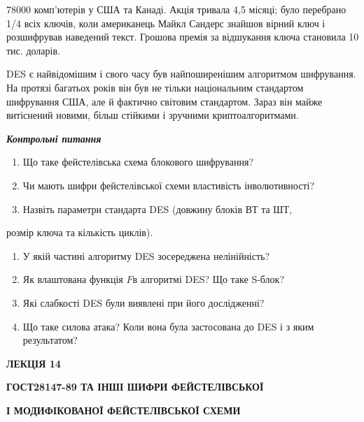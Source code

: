 78000 комп’ютерів у США та Канаді. Акція тривала 4,5 місяці; було перебрано 1/4
всіх ключів, коли американець Майкл Сандерс знайшов вірний ключ і розшифрував
наведений текст. Грошова премія за відшукання ключа становила 10 тис. доларів.

DES є найвідомішим і свого часу був найпоширенішим алгоритмом шифрування. На
протязі багатьох років він був не тільки національним стандартом шифрування
США, але й фактично світовим стандартом. Зараз він майже витіснений новими,
більш стійкими і зручними криптоалгоритмами.


\bigskip

{\centering\bfseries\itshape
Контрольні питання
\par}


\bigskip


\bigskip

\liststyleWWviiiNumxviii
\begin{enumerate}
\item Що таке фейстелівська схема блокового шифрування? 
\item Чи мають шифри фейстелівської схеми властивість інволютивності?
\item Назвіть параметри стандарта DES (довжину блоків ВТ та ШТ, 
\end{enumerate}
розмір ключа та кількість циклів).

\liststyleWWviiiNumxviii
\setcounter{saveenum}{\value{enumi}}
\begin{enumerate}
\setcounter{enumi}{\value{saveenum}}
\item У якій частині алгоритму DES зосереджена нелінійність?
\item Як влаштована функція $F$в алгоритмі DES? Що таке
S{}-блок?
\item Які слабкості DES були виявлені при його дослідженні?
\item Що таке силова атака? Коли вона була застосована до DES і з яким
результатом?
\end{enumerate}

\bigskip


\bigskip

{\bfseries
ЛЕКЦІЯ  14}


\bigskip

{\centering\bfseries
ГОСТ28147-89  ТА ІНШІ ШИФРИ  ФЕЙСТЕЛІВСЬКОЇ 
\par}

{\centering\bfseries
І  МОДИФІКОВАНОЇ  ФЕЙСТЕЛІВСЬКОЇ  СХЕМИ
\par}


